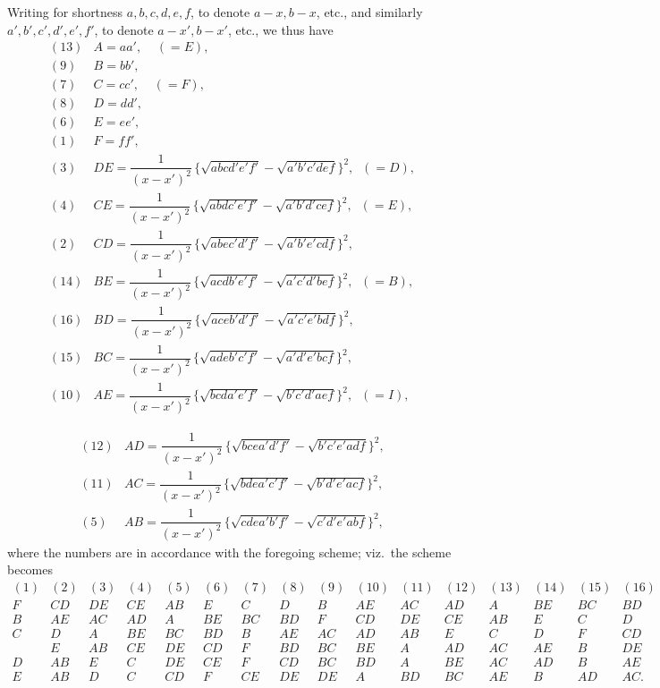 \documentclass[11pt,a4paper]{article}
\begin{document}
Writing for shortness $a, b, c, d, e, f$, to denote $a - x, b - x$, etc., and similarly $a', b', c', d', e', f'$, to denote $a - x', b - x'$, etc., we thus have
\[
\begin{array}{rl}
(13) & A = aa',\;\;\;\; (= E),\\
(9) & B = bb',\\
(7) & C = cc',\;\;\;\; (= F),\\
(8) & D = dd',\\
(6) & E = ee',\\
(1) & F = ff',\\
(3) & DE = \dfrac{1}{(x - x')^{2}}\,\{\sqrt{abcd'e'f'} - \sqrt{a'b'c'def}\}^{2},\;\;(= D),\\
(4) & CE = \dfrac{1}{(x - x')^{2}}\,\{\sqrt{abdc'e'f'} - \sqrt{a'b'd'cef}\}^{2},\;\;(= E),\\
(2) & CD = \dfrac{1}{(x - x')^{2}}\,\{\sqrt{abec'd'f'} - \sqrt{a'b'e'cdf}\}^{2},\\
(14) & BE = \dfrac{1}{(x - x')^{2}}\,\{\sqrt{acdb'e'f'} - \sqrt{a'c'd'bef}\}^{2},\;\;(= B),\\
(16) & BD = \dfrac{1}{(x - x')^{2}}\,\{\sqrt{aceb'd'f'} - \sqrt{a'c'e'bdf}\}^{2},\\
(15) & BC = \dfrac{1}{(x - x')^{2}}\,\{\sqrt{adeb'c'f'} - \sqrt{a'd'e'bcf}\}^{2},\\
(10) & AE = \dfrac{1}{(x - x')^{2}}\,\{\sqrt{bcda'e'f'} - \sqrt{b'c'd'aef}\}^{2},\;\;(= I),
\end{array}
\]

\newpage


\[
\begin{array}{rl}
(12) & AD = \dfrac{1}{(x - x')^{2}}\,\{\sqrt{bcea'd'f'} - \sqrt{b'c'e'adf}\}^{2},\\
(11) & AC = \dfrac{1}{(x - x')^{2}}\,\{\sqrt{bdea'c'f'} - \sqrt{b'd'e'acf}\}^{2},\\
(5) & AB = \dfrac{1}{(x - x')^{2}}\,\{\sqrt{cdea'b'f'} - \sqrt{c'd'e'abf}\}^{2},
\end{array}
\]
where the numbers are in accordance with the foregoing scheme; viz.\ the scheme becomes
\[
\begin{array}{cccccccccccccccc}
(1) & (2) & (3) & (4) & (5) & (6) & (7) & (8) & (9) & (10) & (11) & (12) & (13) & (14) & (15) & (16)\\
\hline
F & CD & DE & CE & AB & E & C & D & B & AE & AC & AD & A & BE & BC & BD\\
B & AE & AC & AD & A & BE & BC & BD & F & CD & DE & CE & AB & E & C & D\\
C & D & A & BE & BC & BD & B & AE & AC & AD & AB & E & C & D & F & CD\\
& E & AB & CE & DE & CD & F & BD & BC & BE & A & AD & AC & AE & B & DE\\
D & AB & E & C & DE & CE & F & CD & BC & BD & A & BE & AC & AD & B & AE\\
E & AB & D & C & CD & F & CE & DE & DE & A & BD & BC & AE & B & AD & AC.
\end{array}
\]
\end{document}
